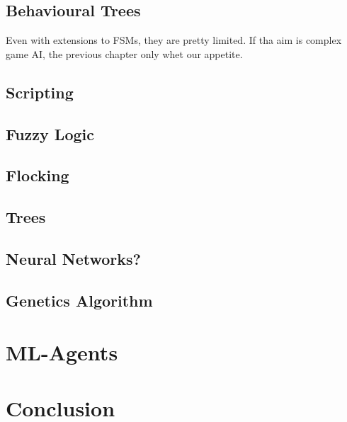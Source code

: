 \documentclass[a4paper, 12pt]{book}
\begin{document}
\section{Behavioural Trees}

Even with extensions to FSMs, they are pretty limited. If tha aim is complex game AI, the previous chapter only whet our appetite.

\section{Scripting}

\section{Fuzzy Logic}

\section{Flocking}

\section{Trees}

\section{Neural Networks?}

\section{Genetics Algorithm}

\chapter{ML-Agents}
\label{ch3}


\chapter{Conclusion}
\label{ch4}



\cleardoublepage
{}


\end{document}
